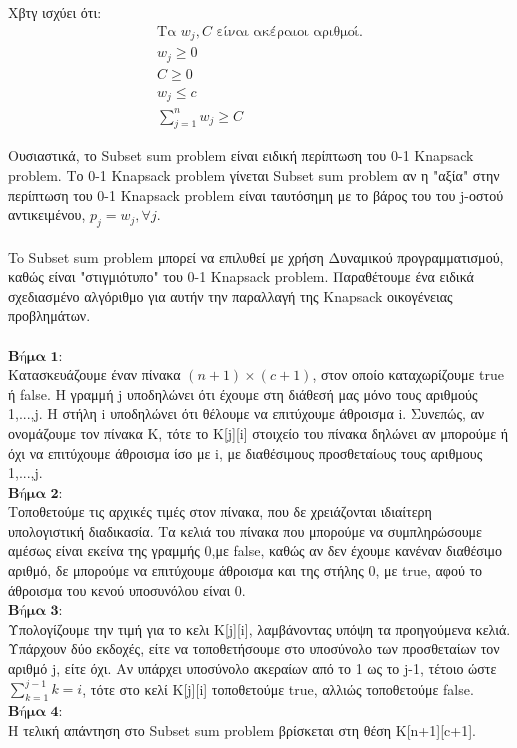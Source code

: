 \documentclass[12pt]{article}
\begin{document}
Χβτγ ισχύει ότι: \\
\begin{align*}
\text{Τα } w_{j}, C \text{ είναι ακέραιοι αριθμοί.} \\
w_{j} \geq 0 \\
C \geq 0 \\
w_{j} \leq c \\
\sum_{j=1}^{n} w_{j} \geq C 
\end{align*}

Ουσιαστικά, το Subset sum problem είναι ειδική περίπτωση του 0-1 Knapsack problem. Το 0-1 Knapsack problem γίνεται Subset sum problem αν η "αξία" στην περίπτωση του 0-1 Knapsack problem είναι ταυτόσημη με το βάρος του  του j-οστού αντικειμένου, \(p_{j} = w_{j}, \forall j\). \\ \\

To Subset sum problem μπορεί να επιλυθεί με χρήση Δυναμικού προγραμματισμού, καθώς είναι "στιγμιότυπο" του 0-1 Knapsack problem. Παραθέτουμε ένα ειδικά σχεδιασμένο αλγόριθμο για αυτήν την παραλλαγή της Knapsack οικογένειας προβλημάτων.\\ \\

\(\textbf{Βήμα 1:}\) \\
Κατασκευάζουμε έναν πίνακα \((n+1) \times (c+1)\), στον οποίο καταχωρίζουμε true ή false. Η γραμμή j υποδηλώνει ότι έχουμε στη διάθεσή μας μόνο τους αριθμούς 1,...,j. Η στήλη i υποδηλώνει ότι θέλουμε να επιτύχουμε άθροισμα i. Συνεπώς, αν ονομάζουμε τον πίνακα Κ, τότε το Κ[j][i] στοιχείο του πίνακα δηλώνει αν μπορούμε ή όχι να επιτύχουμε άθροισμα ίσο με i, με διαθέσιμους προσθεταίoυς τους αριθμους 1,...,j. \\
\(\textbf{Βήμα 2:}\) \\
Τοποθετούμε τις αρχικές τιμές στον πίνακα, που δε χρειάζονται ιδιαίτερη υπολογιστική διαδικασία. Τα κελιά του πίνακα που μπορούμε να συμπληρώσουμε αμέσως είναι εκείνα της γραμμής 0,με false, καθώς αν δεν έχουμε κανέναν διαθέσιμο αριθμό, δε μπορούμε να επιτύχουμε άθροισμα και της στήλης 0, με true, αφού το άθροισμα του κενού υποσυνόλου είναι 0. \\ 
\(\textbf{Βήμα 3:}\) \\
Υπολογίζουμε την τιμή για το κελι Κ[j][i], λαμβάνοντας υπόψη τα προηγούμενα κελιά. Υπάρχουν δύο εκδοχές, είτε να τοποθετήσουμε στο υποσύνολο των προσθεταίων τον αριθμό j, είτε όχι. Αν υπάρχει υποσύνολο ακεραίων από το 1 ως το j-1, τέτοιο ώστε \(\sum_{k=1}^{j-1}k = i\), τότε στο κελί Κ[j][i] τοποθετούμε true, αλλιώς τοποθετούμε false. \\ 
\(\textbf{Βήμα 4:}\) \\
Η τελική απάντηση στο Subset sum problem βρίσκεται στη θέση Κ[n+1][c+1].
\end{document}
